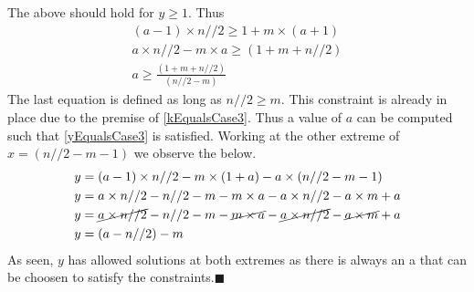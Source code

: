 \documentclass[12pt, twoside]{article}
\begin{document}
 The above should hold for $y \geq 1$. Thus
 \begin{align*}
 	(a-1)\times n//2 \geq 1 +  m \times (a+1) \\
 	a\times n//2 -m\times a \geq (1+m+n//2) \\
 	a \geq \frac{(1+m+n//2)}{(n//2-m)}
 \end{align*}
The last equation is defined as long as $n//2 \ge m$. This constraint is already in place due to the premise of \eqref{kEqualsCase3}. Thus a value of \textbf{$a$} can be computed such that \eqref{yEqualsCase3} is satisfied.\newline
Working at the other extreme of $x = (n//2 - m -1)$ we observe the below.
\begin{align*}
	y &= (a-1)\times n//2 -m \times(1+a) -a \times (n//2 -m -1) \\
	y &= a\times n//2 - n//2 -m -m\times a -a \times n//2 - a\times m + a \\
	y &= \cancel{a\times n//2} - n//2 -m -\cancel{m\times a} -\cancel{a \times n//2} - \cancel{a\times m} + a \\
	y &= (a - n//2) - m
\end{align*}
As seen, $y$ has allowed solutions at both extremes as there is always an a that can be choosen to satisfy the constraints.$\blacksquare$
\end{document}
